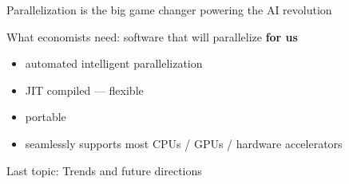 \documentclass[
    xcolor={svgnames,dvipsnames},
    hyperref={colorlinks, citecolor=DeepPink4, linkcolor=DarkRed, urlcolor=DarkBlue}
    ]{beamer}  %
\newcommand{\1}{\mathbbm 1}
\begin{document}
\begin{frame}

    Parallelization is the big game changer powering the AI revolution   


    \begin{figure}
       \begin{center}
       \end{center}
    \end{figure}

\end{frame}


\begin{frame}
    
    What economists need: software that will parallelize \textbf{for us}

    \begin{itemize}
        \item automated intelligent parallelization
    \vspace{0.5em}
        \item JIT compiled  --- flexible
    \vspace{0.5em}
        \item portable
    \vspace{0.5em}
        \item seamlessly supports most CPUs / GPUs / hardware accelerators
    \end{itemize}



\end{frame}


\begin{frame}
    

    Last topic: Trends and future directions

\end{frame}
\end{document}
